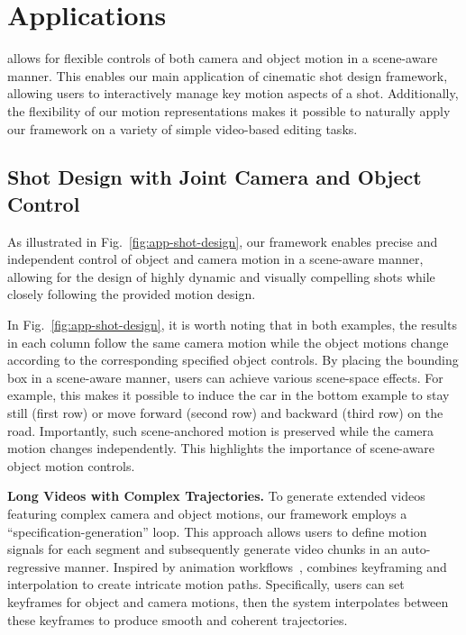 \section{Applications}
\label{sec-4-applications}

\MOCA allows for flexible controls of both camera and object motion in a scene-aware manner. This enables our main application of cinematic shot design framework, allowing users to interactively manage key motion aspects of a shot. 
Additionally, the flexibility of our motion representations makes it possible to naturally apply our framework on a variety of simple video-based editing tasks.


\subsection{Shot Design with Joint Camera and Object Control}

As illustrated in Fig.~\ref{fig:app-shot-design}, our framework enables precise and independent control of object and camera motion in a scene-aware manner, allowing for the design of highly dynamic and visually compelling shots while closely following the provided motion design. 

In Fig.~\ref{fig:app-shot-design}, it is worth noting that in both examples, the results in each column follow the same camera motion while the object motions change according to the corresponding specified object controls. By placing the bounding box in a scene-aware manner, users can achieve various scene-space effects. For example, this makes it possible to induce the car in the bottom example to stay still (first row) or move forward (second row) and backward (third row) on the road. Importantly, such scene-anchored motion is preserved while the camera motion changes independently. 
This highlights the importance of scene-aware object motion controls.


\textbf{Long Videos with Complex Trajectories.}
To generate extended videos featuring complex camera and object motions, our framework employs a ``specification-generation'' loop. This approach allows users to define motion signals for each segment and subsequently generate video chunks in an auto-regressive manner. Inspired by animation workflows~\cite{xing2024tooncrafter,tang2025generativeaicelanimationsurvey}, \MOCA combines keyframing and interpolation to create intricate motion paths. Specifically, users can set keyframes for object and camera motions, then the system interpolates between these keyframes to produce smooth and coherent trajectories. 



